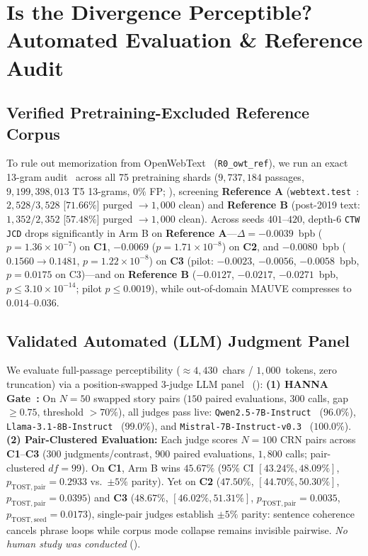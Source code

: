 \documentclass[11pt,a4paper]{article}
\begin{document}
\section{Is the Divergence Perceptible? Automated Evaluation \& Reference Audit}
\label{sec:perceptibility}

\subsection{Verified Pretraining-Excluded Reference Corpus}
To rule out memorization from OpenWebText~\citep{gokaslan2019openwebtext} (\texttt{R0\_owt\_ref}), we run an exact 13-gram audit~\citep{brown2020language} across all 75 pretraining shards ($9{,}737{,}184$ passages, $9{,}199{,}398{,}013$ T5 13-grams, $0\%$ FP; ), screening \textbf{Reference A} (\texttt{webtext.test}~\citep{radford2019language}: $2{,}528/3{,}528$ [$71.66\%$] purged $\to 1{,}000$ clean) and \textbf{Reference B} (post-2019 text: $1{,}352/2{,}352$ [$57.48\%$] purged $\to 1{,}000$ clean). Across seeds $401\text{--}420$, depth-6 \texttt{CTW JCD} drops significantly in Arm B on \textbf{Reference A}---$\Delta = -0.0039$~bpb ($p=1.36\times 10^{-7}$) on \textbf{C1}, $-0.0069$ ($p=1.71\times 10^{-8}$) on \textbf{C2}, and $-0.0080$~bpb ($0.1560 \to 0.1481$, $p=1.22\times 10^{-8}$) on \textbf{C3} (pilot: $-0.0023$, $-0.0056$, $-0.0058$~bpb, $p=0.0175$ on C3)---and on \textbf{Reference B} ($-0.0127$, $-0.0217$, $-0.0271$~bpb, $p \le 3.10\times 10^{-14}$; pilot $p \le 0.0019$), while out-of-domain MAUVE compresses to $0.014\text{--}0.036$.

\subsection{Validated Automated (LLM) Judgment Panel}
We evaluate full-passage perceptibility ($\approx 4{,}430$~chars / $1{,}000$~tokens, zero truncation) via a position-swapped 3-judge LLM panel~\citep{zheng2023judging} ():
\textbf{(1) HANNA Gate~\citep{chhun2022hanna}:} On $N=50$ swapped story pairs ($150$ paired evaluations, $300$ calls, gap $\ge 0.75$, threshold $>70\%$), all judges pass live: \texttt{Qwen2.5-7B-Instruct}~\citep{yang2025qwen25} ($96.0\%$), \texttt{Llama-3.1-8B-Instruct}~\citep{grattafiori2024llama3} ($99.0\%$), and \texttt{Mistral-7B-Instruct-v0.3}~\citep{jiang2023mistral7b} ($100.0\%$).
\textbf{(2) Pair-Clustered Evaluation:} Each judge scores $N=100$ CRN pairs across \textbf{C1}--\textbf{C3} ($300$ judgments/contrast, $900$ paired evaluations, $1{,}800$ calls; pair-clustered $df=99$). On \textbf{C1}, Arm B wins $45.67\%$ (95\% CI $[43.24\%, 48.09\%]$, $p_{\mathrm{TOST,pair}}=0.2933$ vs.\ $\pm 5\%$ parity). Yet on \textbf{C2} ($47.50\%$, $[44.70\%, 50.30\%]$, $p_{\mathrm{TOST,pair}}=0.0395$) and \textbf{C3} ($48.67\%$, $[46.02\%, 51.31\%]$, $p_{\mathrm{TOST,pair}}=0.0035$, $p_{\mathrm{TOST,seed}}=0.0173$), single-pair judges establish $\pm 5\%$ parity: sentence coherence cancels phrase loops while corpus mode collapse remains invisible pairwise. \emph{No human study was conducted} ().
\end{document}
